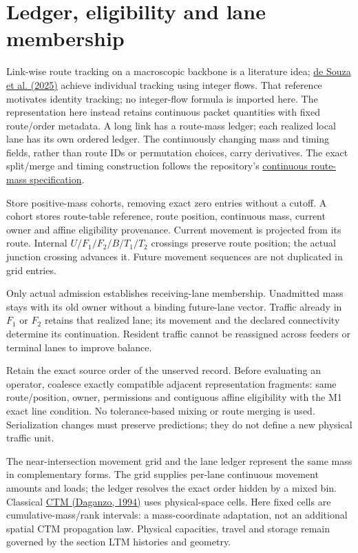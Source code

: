 \documentclass[10pt,a4paper]{article}
\newcommand{\rev}[1]{{\color{revisionred}#1}}
\begin{document}
\section{Ledger, eligibility and lane membership}


Link-wise route tracking on a macroscopic backbone is a literature idea;
\href{https://doi.org/10.1016/j.simpat.2025.103088}{de Souza et al. (2025)}
achieve individual tracking using integer flows.
\rev{That reference motivates identity tracking; no integer-flow formula is imported here.}
The representation here
instead retains continuous packet quantities with fixed route/order
metadata. A long link has a route-mass ledger; each realized local lane
has its own ordered ledger. The continuously changing mass and timing
fields, rather than route IDs or permutation choices, carry derivatives.
The exact split/merge and timing construction follows the repository's
\href{../../../../docs/milestones/milestone_1_ordered_route_mass_ledger.md}{continuous route-mass specification}.
\par

Store positive-mass cohorts, removing exact zero entries without a cutoff.
A cohort stores route-table reference, route position, continuous mass,
current owner and affine eligibility provenance. Current movement is
projected from its route. Internal $U/F_1/F_2/B/T_1/T_2$ crossings preserve route
position; the actual junction crossing advances it. Future movement
sequences are not duplicated in grid entries.

Only actual admission establishes receiving-lane membership. Unadmitted
mass stays with its old owner without a binding future-lane vector.
Traffic already in $F_1$ or $F_2$ retains that realized lane; its movement
and the declared connectivity determine its continuation. Resident traffic
cannot be reassigned across feeders or terminal lanes to improve balance.

Retain the exact source order of the unserved record. Before evaluating
an operator, coalesce exactly compatible adjacent representation fragments:
same route/position, owner, permissions and contiguous affine eligibility
with the M1 exact line condition. No tolerance-based mixing or route
merging is used. Serialization changes must preserve predictions; they
do not define a new physical traffic unit.


The near-intersection movement grid and the lane ledger represent the
same mass in complementary forms. The grid supplies per-lane continuous
movement amounts and loads; the ledger resolves the exact order hidden
by a mixed bin. Classical
\href{https://doi.org/10.1016/0191-2615(94)90002-7}{CTM (Daganzo, 1994)}
uses physical-space cells. Here fixed cells are cumulative-mass/rank
intervals: a mass-coordinate adaptation, not an additional spatial CTM
propagation law. Physical capacities, travel and storage remain governed
by the section LTM histories and geometry.
\end{document}

